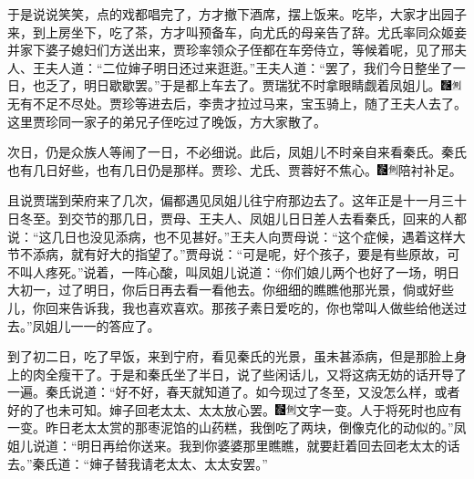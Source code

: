 于是说说笑笑，点的戏都唱完了，方才撤下酒席，摆上饭来。吃毕，大家才出园子来，到上房坐下，吃了茶，方才叫预备车，向尤氏的母亲告了辞。尤氏率同众姬妾并家下婆子媳妇们方送出来，贾珍率领众子侄都在车旁侍立，等候着呢，见了邢夫人、王夫人道：``二位婶子明日还过来逛逛。''王夫人道：``罢了，我们今日整坐了一日，也乏了，明日歇歇罢。''于是都上车去了。贾瑞犹不时拿眼睛觑着凤姐儿。{\includegraphics[width=3mm]{../Images/00006}\includegraphics[width=3mm]{../Images/00011}\footnotesize \kaishu 无有不足不尽处。}贾珍等进去后，李贵才拉过马来，宝玉骑上，随了王夫人去了。这里贾珍同一家子的弟兄子侄吃过了晚饭，方大家散了。

次日，仍是众族人等闹了一日，不必细说。此后，凤姐儿不时亲自来看秦氏。秦氏也有几日好些，也有几日仍是那样。贾珍、尤氏、贾蓉好不焦心。{\includegraphics[width=3mm]{../Images/00006}\includegraphics[width=3mm]{../Images/00011}\footnotesize \kaishu 陪衬补足。}

且说贾瑞到荣府来了几次，偏都遇见凤姐儿往宁府那边去了。这年正是十一月三十日冬至。到交节的那几日，贾母、王夫人、凤姐儿日日差人去看秦氏，回来的人都说：``这几日也没见添病，也不见甚好。''王夫人向贾母说：``这个症候，遇着这样大节不添病，就有好大的指望了。''贾母说：``可是呢，好个孩子，要是有些原故，可不叫人疼死。''说着，一阵心酸，叫凤姐儿说道：``你们娘儿两个也好了一场，明日大初一，过了明日，你后日再去看一看他去。你细细的瞧瞧他那光景，倘或好些儿，你回来告诉我，我也喜欢喜欢。那孩子素日爱吃的，你也常叫人做些给他送过去。''凤姐儿一一的答应了。

到了初二日，吃了早饭，来到宁府，看见秦氏的光景，虽未甚添病，但是那脸上身上的肉全瘦干了。于是和秦氏坐了半日，说了些闲话儿，又将这病无妨的话开导了一遍。秦氏说道：``好不好，春天就知道了。如今现过了冬至，又没怎么样，或者好的了也未可知。婶子回老太太、太太放心罢。{\includegraphics[width=3mm]{../Images/00006}\includegraphics[width=3mm]{../Images/00011}\footnotesize \kaishu 文字一变。人于将死时也应有一变。}昨日老太太赏的那枣泥馅的山药糕，我倒吃了两块，倒像克化的动似的。''凤姐儿说道：``明日再给你送来。我到你婆婆那里瞧瞧，就要赶着回去回老太太的话去。''秦氏道：``婶子替我请老太太、太太安罢。''

